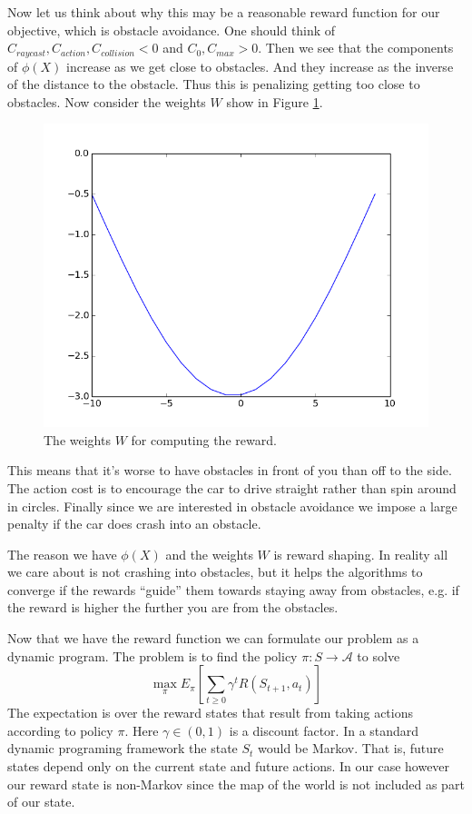 \documentclass{article}
\begin{document}
Now let us think about why this may be a reasonable reward function for our objective, which is obstacle avoidance. One should think of $C_{raycast}, C_{action}, C_{collision} < 0$ and $C_0, C_{max} > 0$. Then we see that the components of $\phi(X)$ increase as we get close to obstacles. And they increase as the inverse of the distance to the obstacle. Thus this is penalizing getting too close to obstacles. Now consider the weights $W$ show in Figure \ref{figures/raycastRewardWeights.png}.

%
%
\begin{figure}
\centering
\includegraphics[scale=0.5]{figures/raycastRewardWeights.png}
\caption{The weights $W$ for computing the reward.}
\label{figures/raycastRewardWeights.png}
\end{figure}
%
%
%
 This means that it's worse to have obstacles in front of you than off to the side. The action cost is to encourage the car to drive straight rather than spin around in circles. Finally since we are interested in obstacle avoidance we impose a large penalty if the car does crash into an obstacle.

The reason we have $\phi(X)$ and the weights $W$ is reward shaping. In reality all we care about is not crashing into obstacles, but it helps the algorithms to converge if the rewards ``guide'' them towards staying away from obstacles, e.g. if the reward is higher the further you are from the obstacles. 

Now that we have the reward function we can formulate our problem as a dynamic program. The problem is to find the policy $\pi:S \to \mathcal{A}$ to solve
%
%
\begin{equation}
\max_{\pi} E_{\pi} \left[ \sum_{t \geq 0} \gamma^t R(S_{t+1}, a_t) \right]
\end{equation}
%
%
The expectation is over the reward states that result from taking actions according to policy $\pi$. Here $\gamma \in (0,1)$ is a discount factor. In a standard dynamic programing framework the state $S_t$ would be Markov. That is, future states depend only on the current state and future actions. In our case however our reward state is non-Markov since the map of the world is not included as part of our state. 
\end{document}
